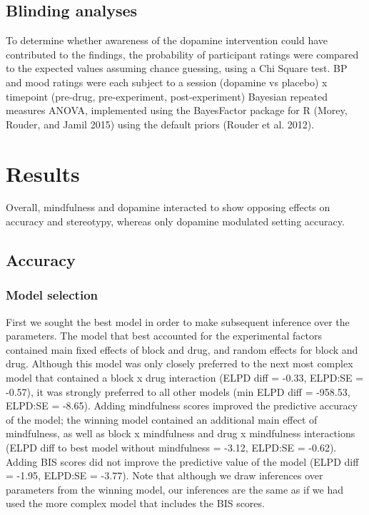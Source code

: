 \documentclass{article}
\begin{document}
\hypertarget{blinding-analyses}{%
\subsection{Blinding analyses}\label{blinding-analyses}}

To determine whether awareness of the dopamine intervention could have
contributed to the findings, the probability of participant ratings were
compared to the expected values assuming chance guessing, using a Chi
Square test. BP and mood ratings were each subject to a session
(dopamine vs placebo) x timepoint (pre-drug, pre-experiment,
post-experiment) Bayesian repeated measures ANOVA, implemented using the
BayesFactor package for R (Morey, Rouder, and Jamil 2015) using the
default priors (Rouder et al. 2012).

\hypertarget{results}{%
\section{Results}\label{results}}

Overall, mindfulness and dopamine interacted to show opposing effects on
accuracy and stereotypy, whereas only dopamine modulated setting
accuracy.

\hypertarget{accuracy-1}{%
\subsection{Accuracy}\label{accuracy-1}}

\hypertarget{model-selection}{%
\subsubsection{Model selection}\label{model-selection}}

First we sought the best model in order to make subsequent inference
over the parameters. The model that best accounted for the experimental
factors contained main fixed effects of block and drug, and random
effects for block and drug. Although this model was only closely
preferred to the next most complex model that contained a block x drug
interaction (ELPD diff = -0.33, ELPD:SE = -0.57), it was strongly
preferred to all other models (min ELPD diff = -958.53, ELPD:SE =
-8.65). Adding mindfulness scores improved the predictive accuracy of
the model; the winning model contained an additional main effect of
mindfulness, as well as block x mindfulness and drug x mindfulness
interactions (ELPD diff to best model without mindfulness = -3.12,
ELPD:SE = -0.62). Adding BIS scores did not improve the predictive value
of the model (ELPD diff = -1.95, ELPD:SE = -3.77). Note that although we
draw inferences over parameters from the winning model, our inferences
are the same as if we had used the more complex model that includes the
BIS scores.
\end{document}
